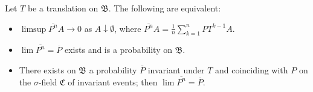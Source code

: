 Let $T$ be a translation on $\mathfrak{B}$. The following are equivalent:
\begin{itemize}
\item[(i)] $\limsup\overline{P^n}A\to 0$ as $A\downarrow\emptyset$, where $\overline{P^n}A=\frac{1}{n}\sum_{k=1}^n PT^{k-1}A$.
\item[(ii)] $\lim\overline{P^n}=\overline{P}$ exists and is a probability on $\mathfrak{B}$.
\item[(iii)] There exists on $\mathfrak{B}$ a probability $\overline{P}$ invariant under $T$ and coinciding with $P$ on the $\sigma$-field $\mathfrak{C}$ of invariant events; then $\lim\overline{P^n}=\overline{P}$.
\end{itemize}

